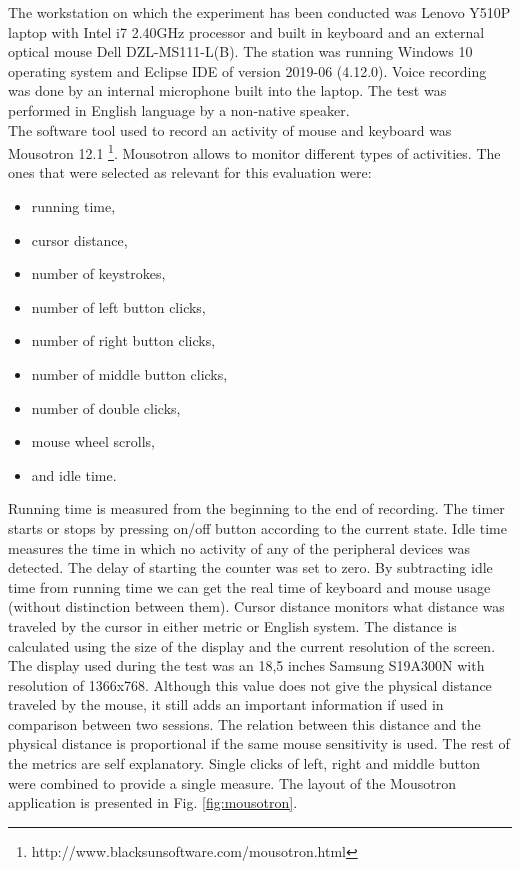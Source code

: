 The workstation on which the experiment has been conducted was Lenovo Y510P laptop with Intel i7 2.40GHz processor and built in keyboard and an external optical mouse Dell DZL-MS111-L(B). The station was running Windows 10 operating system and Eclipse IDE of version 2019-06 (4.12.0). Voice recording was done by an internal microphone built into the laptop. The test was performed in English language by a non-native speaker. \\
The software tool used to record an activity of mouse and keyboard was Mousotron 12.1 \footnote{http://www.blacksunsoftware.com/mousotron.html}.
Mousotron allows to monitor different types of activities. The ones that were selected as relevant for this evaluation were:
\begin{itemize}
    \item running time,
    \item cursor distance,
    \item number of keystrokes,
    \item number of left button clicks,
    \item number of right button clicks,
    \item number of middle button clicks,
    \item number of double clicks,
    \item mouse wheel scrolls,
    \item and idle time.
\end{itemize}
Running time is measured from the beginning to the end of recording. The timer starts or stops by pressing on/off button according to the current state. Idle time measures the time in which no activity of any of the peripheral devices was detected. The delay of starting the counter was set to zero. By subtracting idle time from running time we can get the real time of keyboard and mouse usage (without distinction between them). Cursor distance monitors what distance was traveled by the cursor in either metric or English system. The distance is calculated using the size of the display and the current resolution of the screen. The display used during the test was an 18,5 inches Samsung S19A300N with resolution of 1366x768. Although this value does not give the physical distance traveled by the mouse, it still adds an important information if used in comparison between two sessions. The relation between this distance and the physical distance is proportional if the same mouse sensitivity is used. The rest of the metrics are self explanatory. Single clicks of left, right and middle button were combined to provide a single measure. The layout of the Mousotron application is presented in Fig. \ref{fig:mousotron}. 

